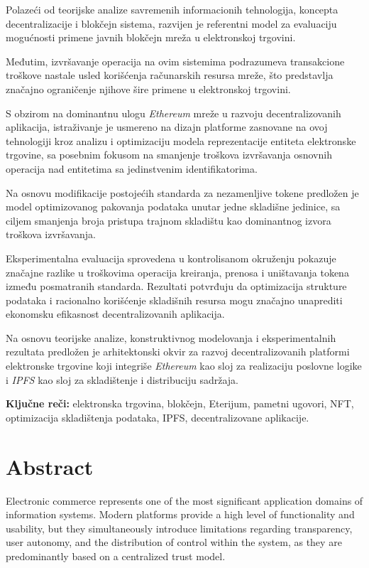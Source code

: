 Polazeći od teorijske analize savremenih informacionih tehnologija, koncepta decentralizacije i blokčejn sistema, razvijen je referentni model za evaluaciju mogućnosti primene javnih blokčejn mreža u elektronskoj trgovini.

Međutim, izvršavanje operacija na ovim sistemima podrazumeva transakcione troškove nastale usled korišćenja računarskih resursa mreže, što predstavlja značajno ograničenje njihove šire primene u elektronskoj trgovini.

S obzirom na dominantnu ulogu \textit{Ethereum} mreže u razvoju decentralizovanih aplikacija, istraživanje je usmereno na dizajn platforme zasnovane na ovoj tehnologiji kroz analizu i optimizaciju modela reprezentacije entiteta elektronske trgovine, sa posebnim fokusom na smanjenje troškova izvršavanja osnovnih operacija nad entitetima sa jedinstvenim identifikatorima.

Na osnovu modifikacije postojećih standarda za nezamenljive tokene predložen je model optimizovanog pakovanja podataka unutar jedne skladišne jedinice, sa ciljem smanjenja broja pristupa trajnom skladištu kao dominantnog izvora troškova izvršavanja.

Eksperimentalna evaluacija sprovedena u kontrolisanom okruženju pokazuje značajne razlike u troškovima operacija kreiranja, prenosa i uništavanja tokena između posmatranih standarda. Rezultati potvrđuju da optimizacija strukture podataka i racionalno korišćenje skladišnih resursa mogu značajno unaprediti ekonomsku efikasnost decentralizovanih aplikacija.

Na osnovu teorijske analize, konstruktivnog modelovanja i eksperimentalnih rezultata predložen je arhitektonski okvir za razvoj decentralizovanih platformi elektronske trgovine koji integriše \textit{Ethereum} kao sloj za realizaciju poslovne logike i \textit{IPFS} kao sloj za skladištenje i distribuciju sadržaja.

\vspace{0.5em}

\textbf{Ključne reči:} elektronska trgovina, blokčejn, Eterijum, pametni ugovori, NFT, optimizacija skladištenja podataka, IPFS, decentralizovane aplikacije.

\section*{Abstract}
Electronic commerce represents one of the most significant application domains of information systems. Modern platforms provide a high level of functionality and usability, but they simultaneously introduce limitations regarding transparency, user autonomy, and the distribution of control within the system, as they are predominantly based on a centralized trust model.

